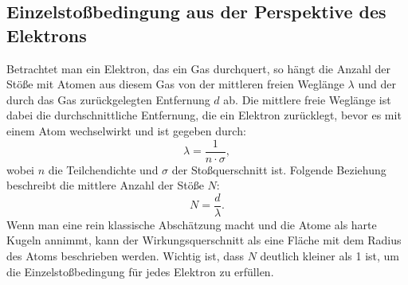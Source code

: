 \subsection{Einzelstoßbedingung aus der Perspektive des Elektrons}
Betrachtet man ein Elektron, das ein Gas durchquert, so hängt die Anzahl der Stöße mit Atomen aus diesem Gas von der mittleren freien Weglänge $\lambda$ und der durch das Gas zurückgelegten Entfernung $d$ ab. Die mittlere freie Weglänge ist dabei die durchschnittliche Entfernung, die ein Elektron zurücklegt, bevor es mit einem Atom wechselwirkt und ist gegeben durch:
\begin{equation}
    \lambda = \frac{1}{n \cdot \sigma},
\end{equation}
wobei $n$ die Teilchendichte und $\sigma$ der Stoßquerschnitt ist.
Folgende Beziehung beschreibt die mittlere Anzahl der Stöße $N$:
\begin{equation}
    N = \frac{d}{\lambda}.
\end{equation}
Wenn man eine rein klassische Abschätzung macht und die Atome als harte Kugeln annimmt, kann der Wirkungsquerschnitt als eine Fläche mit dem Radius des Atoms beschrieben werden. Wichtig ist, dass $N$ deutlich kleiner als 1 ist, um die Einzelstoßbedingung für jedes Elektron zu erfüllen. 